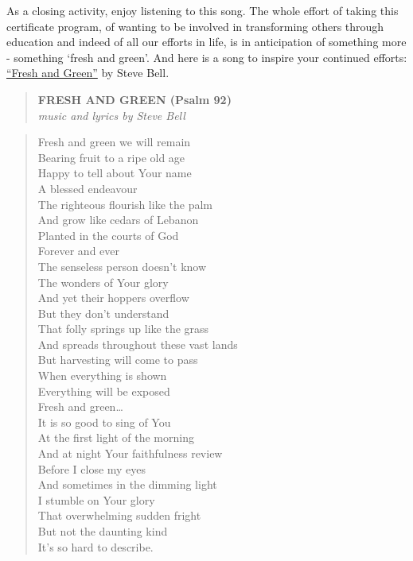 \documentclass[
]{book}
\begin{document}
\begin{video}
As a closing activity, enjoy listening to this song. The whole effort of
taking this certificate program, of wanting to be involved in
transforming others through education and indeed of all our efforts in
life, is in anticipation of something more - something `fresh and
green'. And here is a song to inspire your continued efforts:
\href{https://www.youtube.com/watch?v=uKjVQ5VSaXc}{``Fresh and Green''}
by Steve Bell.

\begin{quote}
\textbf{FRESH AND GREEN (Psalm 92)}\\
\emph{music and lyrics by Steve Bell}
\end{quote}

\begin{quote}
Fresh and green we will remain\\
Bearing fruit to a ripe old age\\
Happy to tell about Your name\\
A blessed endeavour\\
The righteous flourish like the palm\\
And grow like cedars of Lebanon\\
Planted in the courts of God\\
Forever and ever\\
The senseless person doesn't know\\
The wonders of Your glory\\
And yet their hoppers overflow\\
But they don't understand\\
That folly springs up like the grass\\
And spreads throughout these vast lands\\
But harvesting will come to pass\\
When everything is shown\\
Everything will be exposed\\
Fresh and green\ldots{}\\
It is so good to sing of You\\
At the first light of the morning\\
And at night Your faithfulness review\\
Before I close my eyes\\
And sometimes in the dimming light\\
I stumble on Your glory\\
That overwhelming sudden fright\\
But not the daunting kind\\
It's so hard to describe.
\end{quote}
\end{video}
\end{document}
